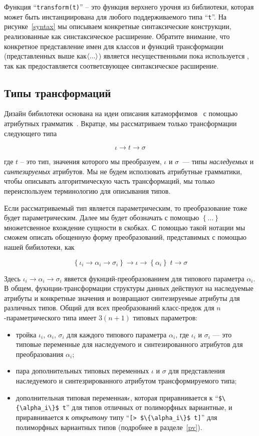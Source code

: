 Функция ``\lstinline{transform(t)}'' -- это функция верхнего урочня из библиотеки, которая может быть инстанциирована для любого поддерживаемого типа  ``\lstinline{t}''. На рисунке~\ref{syntax} мы описываем конкретные синтаксические конструкции, реализованные как синстаксическое расширение. Обратите внимание, что конкретное представление имен для классов и функций трансформации (представленных выше как$\left<...\right>$) является несущественными пока используется , так как предоставляется соответсвующее синтаксическое расширение.

\subsection{Типы трансформаций}

Дизайн бибилотеки основана на идеи описания катаморфизмов~\cite{Bananas} с помощью атрибутных 
грамматик~\cite{AGKnuth,AGSwierstra,ObjectAlgebrasAttribute}.
Вкратце, мы рассматриваем только трансформации следующего типа

\[
\iota \to t \to \sigma
\]

где $t$ -- это тип, значения которого мы преобразуем, $\iota$ и $\sigma$~--- типы \emph{наследуемых} и \emph{синтезируемых} атрибутов. 
Мы не будем исползовать атрибутные грамматики, чтобы описывать алгоритмическую часть трансформаций, мы только переиспользуем терминологию для описывания типов. 

Если рассматриваемый тип является параметрическим, то преобразование тоже будет параметрическим. Далее мы будет обозначать с помощью
$\left\{...\right\}$ множетсвенное вхождение сущности в скобках. С помощью такой нотации мы сможем описать обощенную форму преобразований, представимых с помощью нашей бибилотеки, как

\[
  \left\{\iota_i \to \alpha_i \to \sigma_i\right\}\to\iota \to\left\{\alpha_i\right\}\;t \to \sigma
\]

Здесь $\iota_i\to\alpha_i\to\sigma_i$ явяется фукнций-преобразованием для типового параметра $\alpha_i$. В общем, фукнции-трансформации структуры данных действуют на наследуемые атрибуты и конкретные значения и возвращают синтезируемые атрибуты для различных типов. Общий для всех преобразований класс-предок для $n$-параметрического типа имеет $3(n+1)$ типовых параметров:

\begin{itemize}
\item тройка $\iota_i$, $\alpha_i$, $\sigma_i$ для каждого типового параметра $\alpha_i$, где $\iota_i$ и $\sigma_i$ --- это типовые переменные для наследуемого и синтезированного атрибутов для преобразования  $\alpha_i$;
\item пара дополнительных типовых переменных $\iota$ и $\sigma$ для представления наследуемого и синтезрированного атрибутом трансформируемого типа;
\item дополнительная типовая переменная$\epsilon$, которая приравнивается к ``\lstinline|$\{\alpha_i\}$ t|'' для типов отличных от полиморфных вариантные, и приравнивается к \emph{открытому} типу ``\lstinline|[> $\{\alpha_i\}$ t]|'' для полиморфных вариантных типов (подробнее в 
разделе~\ref{pv}).
\end{itemize}

